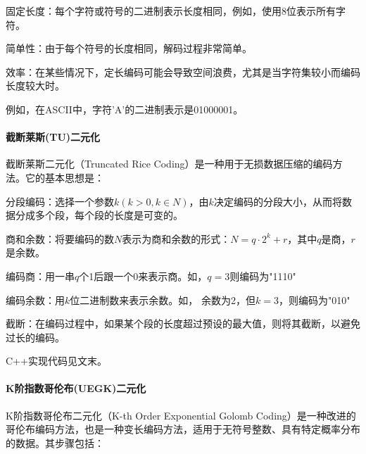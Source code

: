 \documentclass{/Users/hi/Study/template/code}
\begin{document}
固定长度：每个字符或符号的二进制表示长度相同，例如，使用8位表示所有字符。

简单性：由于每个符号的长度相同，解码过程非常简单。

效率：在某些情况下，定长编码可能会导致空间浪费，尤其是当字符集较小而编码长度较大时。

例如，在ASCII中，字符'A'的二进制表示是01000001。


\paragraph{截断莱斯(TU)二元化}
截断莱斯二元化（Truncated Rice Coding）是一种用于无损数据压缩的编码方法。它的基本思想是：
\begin{serialNumber}
	\item 分段编码：选择一个参数$k ( k > 0 , k \in N )$，由$k$决定编码的分段大小，从而将数据分成多个段，每个段的长度是可变的。
	\item 商和余数：将要编码的数$ N $表示为商和余数的形式：\( N = q \cdot 2^k + r \)，其中\( q \)是商，\( r \)是余数。
	\item 编码商：用一串\( q \)个1后跟一个0来表示商。如，$q = 3$则编码为"1110"
	\item 编码余数：用\( k \)位二进制数来表示余数。如， 余数为2，但$k = 3$，则编码为"010"
	\item 截断：在编码过程中，如果某个段的长度超过预设的最大值，则将其截断，以避免过长的编码。
\end{serialNumber}
C++实现代码见文末。



\paragraph{K阶指数哥伦布(UEGK)二元化}
K阶指数哥伦布二元化（K-th Order Exponential Golomb Coding）是一种改进的哥伦布编码方法，也是一种变长编码方法，适用于无符号整数、具有特定概率分布的数据。其步骤包括：
\end{document}
